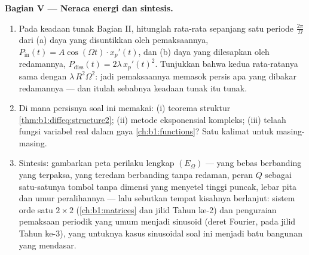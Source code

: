 \begin{problem}
\medskip
\noindent\textbf{Bagian V --- Neraca energi dan sintesis.}
\begin{enumerate}[resume]
  \item Pada keadaan tunak Bagian II, hitunglah rata-rata sepanjang
        satu periode $\frac{2\pi}\Omega$ dari (a) daya yang disuntikkan
        oleh pemaksaannya, $P_{\mathrm{in}}(t) = A\cos(\Omega t)
        \cdot x_p'(t)$, dan (b) daya yang dilesapkan oleh
        redamannya, $P_{\mathrm{diss}}(t) = 2\lambda\,x_p'(t)^2$.
        Tunjukkan bahwa kedua rata-ratanya sama dengan $\lambda\,R^2\Omega^2$: jadi
        pemaksaannya memasok persis apa yang dibakar redamannya --- dan
        itulah sebabnya keadaan tunak itu tunak.
  \item Di mana persisnya soal ini memakai: (i) teorema struktur
        \cref{thm:b1:diffeq:structure2}; (ii) metode eksponensial
        kompleks; (iii) telaah fungsi variabel real dalam gaya
        \cref{ch:b1:functions}? Satu kalimat untuk masing-masing.
  \item Sintesis: gambarkan peta perilaku lengkap $(E_\Omega)$
        --- yang bebas berbanding yang terpaksa, yang teredam berbanding tanpa redaman, peran
        $Q$ sebagai satu-satunya tombol tanpa dimensi yang menyetel tinggi puncak,
        lebar pita dan umur peralihannya --- lalu sebutkan
        tempat kisahnya berlanjut: sistem orde satu $2 \times 2$
        (\cref{ch:b1:matrices} dan jilid Tahun ke-2) dan
        penguraian pemaksaan periodik yang umum menjadi
        sinusoid (deret Fourier, pada jilid Tahun ke-3), yang
        untuknya kasus sinusoidal soal ini menjadi batu bangunan
        yang mendasar.

\end{enumerate}
\end{problem}
